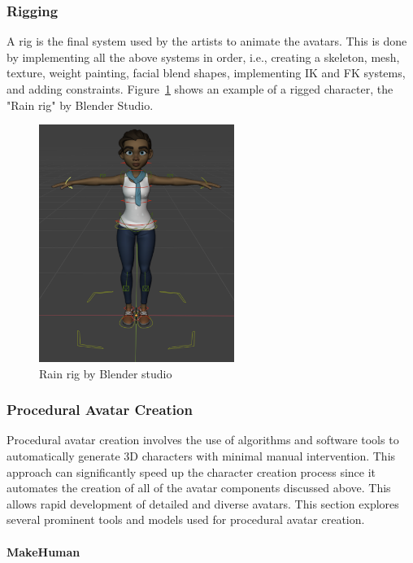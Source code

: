 \documentclass[../../main.tex]{subfiles}
\begin{document}
\subsubsection{Rigging}
\label{ch:background_work:sign_language_synthesis:3d_techniques:rigging}

A rig is the final system used by the artists to animate the avatars. This is done by implementing all the above systems in order, i.e., creating a skeleton, mesh, texture, weight painting, facial blend shapes, implementing IK and FK systems, and adding constraints. Figure~\ref{fig:rig_example} shows an example of a rigged character, the "Rain rig" by Blender Studio.

\begin{figure} 
  \centering \includegraphics[width = 2.5in]{chapters/background_work/images/rig_example.png} 
  \caption{Rain rig by Blender studio} 
  \label{fig:rig_example} 
\end{figure}

\subsubsection{Procedural Avatar Creation}
\label{ch:background_work:sign_language_synthesis:3d_techniques:procedural_avatar_creation}

Procedural avatar creation involves the use of algorithms and software tools to automatically generate 3D characters with minimal manual intervention. This approach can significantly speed up the character creation process since it automates the creation of all of the avatar components discussed above. This allows rapid development of detailed and diverse avatars. This section explores several prominent tools and models used for procedural avatar creation.

\paragraph{MakeHuman}
\label{ch:background_work:sign_language_synthesis:3d_techniques:procedural_avatar_creation:makehuman}
\end{document}
